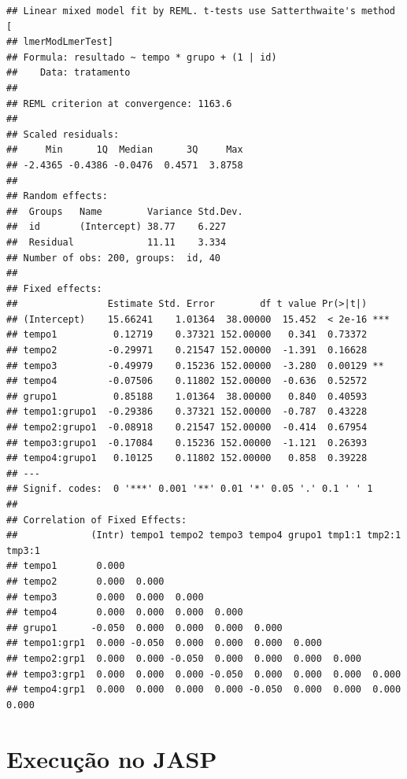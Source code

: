\documentclass[
]{book}
\begin{document}
\begin{verbatim}
## Linear mixed model fit by REML. t-tests use Satterthwaite's method [
## lmerModLmerTest]
## Formula: resultado ~ tempo * grupo + (1 | id)
##    Data: tratamento
## 
## REML criterion at convergence: 1163.6
## 
## Scaled residuals: 
##     Min      1Q  Median      3Q     Max 
## -2.4365 -0.4386 -0.0476  0.4571  3.8758 
## 
## Random effects:
##  Groups   Name        Variance Std.Dev.
##  id       (Intercept) 38.77    6.227   
##  Residual             11.11    3.334   
## Number of obs: 200, groups:  id, 40
## 
## Fixed effects:
##                Estimate Std. Error        df t value Pr(>|t|)    
## (Intercept)    15.66241    1.01364  38.00000  15.452  < 2e-16 ***
## tempo1          0.12719    0.37321 152.00000   0.341  0.73372    
## tempo2         -0.29971    0.21547 152.00000  -1.391  0.16628    
## tempo3         -0.49979    0.15236 152.00000  -3.280  0.00129 ** 
## tempo4         -0.07506    0.11802 152.00000  -0.636  0.52572    
## grupo1          0.85188    1.01364  38.00000   0.840  0.40593    
## tempo1:grupo1  -0.29386    0.37321 152.00000  -0.787  0.43228    
## tempo2:grupo1  -0.08918    0.21547 152.00000  -0.414  0.67954    
## tempo3:grupo1  -0.17084    0.15236 152.00000  -1.121  0.26393    
## tempo4:grupo1   0.10125    0.11802 152.00000   0.858  0.39228    
## ---
## Signif. codes:  0 '***' 0.001 '**' 0.01 '*' 0.05 '.' 0.1 ' ' 1
## 
## Correlation of Fixed Effects:
##             (Intr) tempo1 tempo2 tempo3 tempo4 grupo1 tmp1:1 tmp2:1 tmp3:1
## tempo1       0.000                                                        
## tempo2       0.000  0.000                                                 
## tempo3       0.000  0.000  0.000                                          
## tempo4       0.000  0.000  0.000  0.000                                   
## grupo1      -0.050  0.000  0.000  0.000  0.000                            
## tempo1:grp1  0.000 -0.050  0.000  0.000  0.000  0.000                     
## tempo2:grp1  0.000  0.000 -0.050  0.000  0.000  0.000  0.000              
## tempo3:grp1  0.000  0.000  0.000 -0.050  0.000  0.000  0.000  0.000       
## tempo4:grp1  0.000  0.000  0.000  0.000 -0.050  0.000  0.000  0.000  0.000
\end{verbatim}

\hypertarget{execuuxe7uxe3o-no-jasp-12}{%
\section{Execução no JASP}\label{execuuxe7uxe3o-no-jasp-12}}
\end{document}
